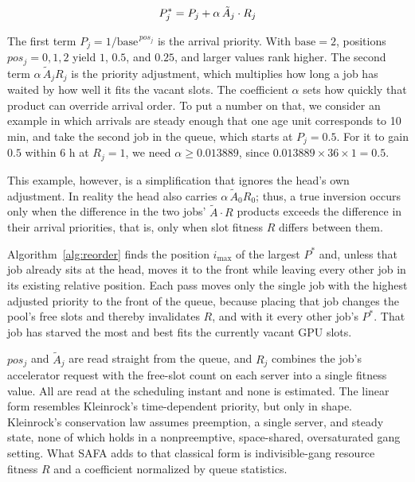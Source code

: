 \documentclass{ieeetj}
\begin{document}
\begin{equation}
P^*_j = P_j + \alpha\, \tilde A_j \cdot R_j
\label{eq:01}
\vspace{2pt}
\end{equation}

The first term $P_j=1/\text{base}^{\,pos_j}$ is the arrival priority. With $\text{base}=2$, positions $pos_j=0,1,2$ yield $1$, $0.5$, and $0.25$, and larger values rank higher. The second term $\alpha\,\tilde A_j R_j$ is the priority adjustment, which multiplies how long a job has waited by how well it fits the vacant slots. The coefficient $\alpha$ sets how quickly that product can override arrival order. To put a number on that, we consider an example in which arrivals are steady enough that one age unit corresponds to 10 min, and take the second job in the queue, which starts at $P_j=0.5$. For it to gain $0.5$ within 6 h at $R_j=1$, we need $\alpha\ge0.013889$, since $0.013889\times36\times1=0.5$.

This example, however, is a simplification that ignores the head's own adjustment. In reality the head also carries $\alpha\,\tilde A_0 R_0$; thus, a true inversion occurs only when the difference in the two jobs' $\tilde A\cdot R$ products exceeds the difference in their arrival priorities, that is, only when slot fitness $R$ differs between them.

Algorithm~\ref{alg:reorder} finds the position $i_{\max}$ of the largest $P^*$ and, unless that job already sits at the head, moves it to the front while leaving every other job in its existing relative position. Each pass moves only the single job with the highest adjusted priority to the front of the queue, because placing that job changes the pool's free slots and thereby invalidates $R$, and with it every other job's $P^*$. That job has starved the most and best fits the currently vacant GPU slots.

$pos_j$ and $\tilde A_j$ are read straight from the queue, and $R_j$ combines the job's accelerator request with the free-slot count on each server into a single fitness value. All are read at the scheduling instant and none is estimated. The linear form resembles Kleinrock's time-dependent priority\cite{kleinrock1976queueing}, but only in shape. Kleinrock's conservation law assumes preemption, a single server, and steady state, none of which holds in a nonpreemptive, space-shared, oversaturated gang setting. What SAFA adds to that classical form is indivisible-gang resource fitness $R$ and a coefficient normalized by queue statistics.
\end{document}
